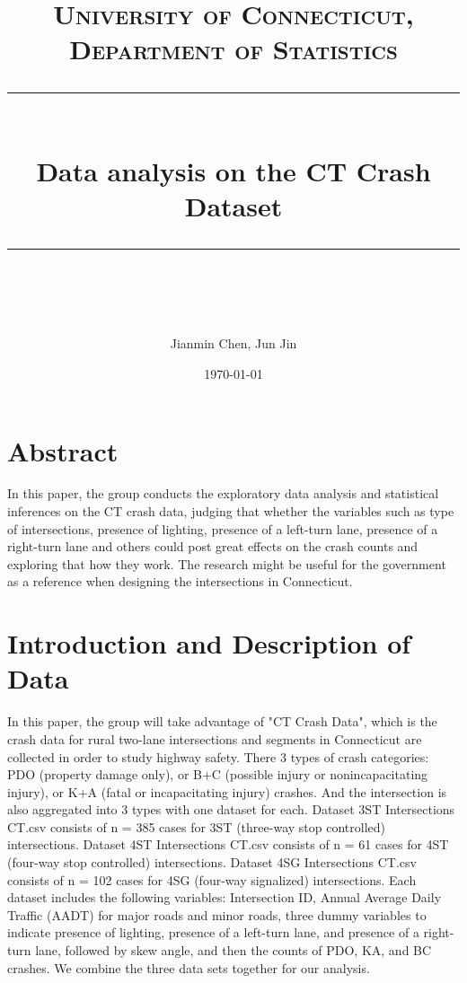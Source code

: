 \documentclass[11pt]{scrartcl} %
\title{	
	\normalfont\normalsize
	\textsc{University of Connecticut, Department of Statistics}\\ %
	\vspace{25pt} %
	\rule{\linewidth}{0.5pt}\\ %
	\vspace{20pt} %
	{\huge Data analysis on the CT Crash Dataset}\\ %
	\vspace{12pt} %
	\rule{\linewidth}{2pt}\\ %
	\vspace{12pt} %
}
\author{\LARGE Jianmin Chen, Jun Jin} %
\date{\normalsize\today} %
\begin{document}
\maketitle %


\tableofcontents


\section{Abstract}

In this paper, the group conducts the exploratory data analysis and statistical inferences on the CT crash data, judging that whether the variables such as type of intersections, presence of lighting, presence of a left-turn lane, presence of a right-turn lane and others could post great effects on the crash counts and exploring that how they work. The research might be useful for the government as a reference when designing the intersections in Connecticut.


\section{Introduction and Description of Data}

In this paper, the group will take advantage of "CT Crash Data", which is the crash data for rural two-lane intersections and segments in Connecticut are collected in order to study highway safety. There 3 types of crash categories: PDO (property damage only), or B+C (possible injury or nonincapacitating injury), or K+A (fatal or incapacitating injury) crashes. And the intersection is also aggregated into 3 types with one dataset for each. Dataset 3ST Intersections CT.csv consists of n = 385 cases for 3ST (three-way stop controlled) intersections. Dataset 4ST Intersections CT.csv consists of n = 61 cases for 4ST (four-way stop controlled) intersections. Dataset 4SG Intersections CT.csv consists of n = 102 cases for 4SG (four-way signalized) intersections. Each dataset includes the following variables: Intersection ID, Annual Average Daily Traffic (AADT) for major roads and minor roads, three dummy variables to indicate presence of lighting, presence of a left-turn lane, and presence of a right-turn lane, followed by skew angle, and then the counts of PDO, KA, and BC crashes.  We combine the three data sets together for our analysis.
\end{document}
